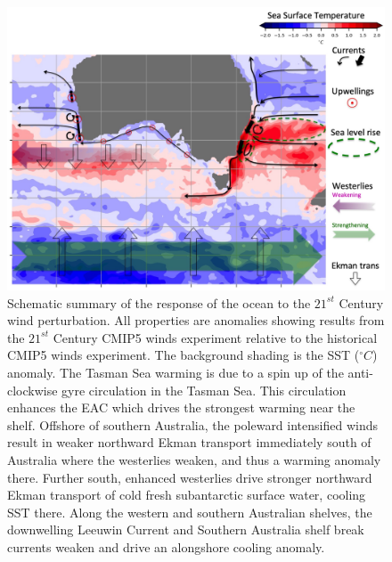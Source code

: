 \documentclass[draft,linenumbers]{agujournal2018}
\begin{document}
\begin{figure}[h]
\centering
\includegraphics[width=1\textwidth]{Slide1.jpg}
\caption{Schematic summary of the response of the ocean to the $21^{st}$ Century wind perturbation. All properties are anomalies showing results from the $21^{st}$ Century CMIP5 winds experiment relative to the historical CMIP5 winds experiment. The background shading is the SST ($^{\circ}C$) anomaly. The Tasman Sea warming is due to a spin up of the anti-clockwise gyre circulation in the Tasman Sea. This circulation enhances the EAC which drives the strongest warming near the shelf. Offshore of southern Australia, the poleward intensified winds result in weaker northward Ekman transport immediately south of Australia where the westerlies weaken, and thus a warming anomaly there. Further south, enhanced westerlies drive stronger northward Ekman transport of cold fresh subantarctic surface water, cooling SST there. Along the western and southern Australian shelves, the downwelling Leeuwin Current and Southern Australia shelf break currents weaken and drive an alongshore cooling anomaly.}\label{Slide1}
\end{figure}

%
%
\end{document}
